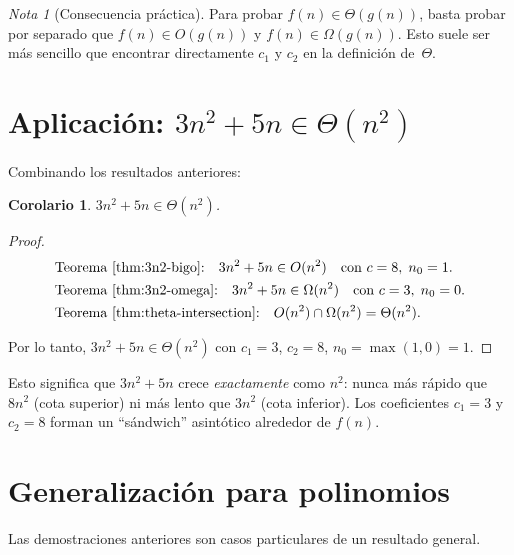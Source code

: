 \documentclass[11pt, letterpaper]{article}
\theoremstyle{definition}
\theoremstyle{plain}
\newtheorem{corollary}[theorem]{Corolario}
\theoremstyle{remark}
\newtheorem*{remark}{Nota}
\begin{document}
\begin{remark}[Consecuencia práctica]
  Para probar $f(n) \in \Theta(g(n))$, basta probar por separado que
  $f(n) \in O(g(n))$ y $f(n) \in \Omega(g(n))$. Esto suele ser más
  sencillo que encontrar directamente $c_1$ y $c_2$ en la definición
  de~$\Theta$.
\end{remark}


\section{Aplicación: \texorpdfstring{$3n^2 + 5n \in \Theta(n^2)$}{3n²+5n ∈ Θ(n²)}}

Combinando los resultados anteriores:

\begin{corollary}
  $3n^2 + 5n \in \Theta(n^2)$.
\end{corollary}

\begin{proof}
  \begin{align*}
    &\text{Teorema~\ref{thm:3n2-bigo}:}\quad
      3n^2 + 5n \in O(n^2)
      \quad\text{con } c = 8,\; n_0 = 1. \\
    &\text{Teorema~\ref{thm:3n2-omega}:}\quad
      3n^2 + 5n \in \Omega(n^2)
      \quad\text{con } c = 3,\; n_0 = 0. \\
    &\text{Teorema~\ref{thm:theta-intersection}:}\quad
      O(n^2) \cap \Omega(n^2) = \Theta(n^2).
  \end{align*}

  Por lo tanto, $3n^2 + 5n \in \Theta(n^2)$ con
  $c_1 = 3$, $c_2 = 8$, $n_0 = \max(1, 0) = 1$.
\end{proof}

Esto significa que $3n^2 + 5n$ crece \emph{exactamente} como $n^2$:
nunca más rápido que $8n^2$ (cota superior) ni más lento que $3n^2$
(cota inferior). Los coeficientes $c_1 = 3$ y $c_2 = 8$ forman un
``sándwich'' asintótico alrededor de $f(n)$.


\section{Generalización para polinomios}

Las demostraciones anteriores son casos particulares de un resultado
general.
\end{document}
